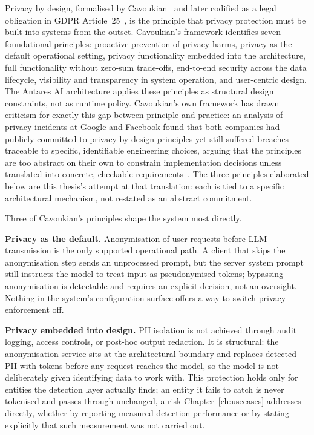 Privacy by design, formalised by Cavoukian~\cite{cavoukian2009privacy} and later codified as a legal obligation in GDPR Article~25~\cite{gdpr2016}, is the principle that privacy protection must be built into systems from the outset. Cavoukian's framework identifies seven foundational principles: proactive prevention of privacy harms, privacy as the default operational setting, privacy functionality embedded into the architecture, full functionality without zero-sum trade-offs, end-to-end security across the data lifecycle, visibility and transparency in system operation, and user-centric design. The Antares AI architecture applies these principles as structural design constraints, not as runtime policy. Cavoukian's own framework has drawn criticism for exactly this gap between principle and practice: an analysis of privacy incidents at Google and Facebook found that both companies had publicly committed to privacy-by-design principles yet still suffered breaches traceable to specific, identifiable engineering choices, arguing that the principles are too abstract on their own to constrain implementation decisions unless translated into concrete, checkable requirements~\cite{rubinstein2013counterfactual}. The three principles elaborated below are this thesis's attempt at that translation: each is tied to a specific architectural mechanism, not restated as an abstract commitment.

Three of Cavoukian's principles shape the system most directly.

\textbf{Privacy as the default.} Anonymisation of user requests before LLM transmission is the only supported operational path. A client that skips the anonymisation step sends an unprocessed prompt, but the server system prompt still instructs the model to treat input as pseudonymised tokens; bypassing anonymisation is detectable and requires an explicit decision, not an oversight. Nothing in the system's configuration surface offers a way to switch privacy enforcement off.

\textbf{Privacy embedded into design.} PII isolation is not achieved through audit logging, access controls, or post-hoc output redaction. It is structural: the anonymisation service sits at the architectural boundary and replaces detected PII with tokens before any request reaches the model, so the model is not deliberately given identifying data to work with. This protection holds only for entities the detection layer actually finds; an entity it fails to catch is never tokenised and passes through unchanged, a risk Chapter~\ref{ch:usecases} addresses directly, whether by reporting measured detection performance or by stating explicitly that such measurement was not carried out.

